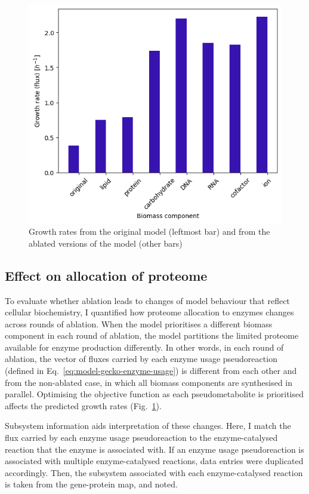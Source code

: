 \begin{figure}
  \centering
  \includegraphics[width=.6\linewidth]{ablation_example_fluxes.png}
  \caption{
    Growth rates from the original model (leftmost bar) and from the ablated versions of the model (other bars)
  }
  \label{fig:model-ablate-fluxes}
\end{figure}


\subsection{Effect on allocation of proteome}
\label{sec:model-yeast8-pseudometabolites-allocation}

To evaluate whether ablation leads to changes of model behaviour that reflect cellular biochemistry, I quantified how proteome allocation to enzymes changes across rounds of ablation.
When the model prioritises a different biomass component in each round of ablation, the model partitions the limited proteome available for enzyme production differently.
In other words, in each round of ablation, the vector of fluxes carried by each enzyme usage pseudoreaction (defined in Eq.\ \ref{eq:model-gecko-enzyme-usage}) is different from each other and from the non-ablated case, in which all biomass components are synthesised in parallel.
Optimising the objective function as each pseudometabolite is prioritised affects the predicted growth rates (Fig.\ \ref{fig:model-ablate-fluxes}).

Subsystem information aids interpretation of these changes.
Here, I match the flux carried by each enzyme usage pseudoreaction to the enzyme-catalysed reaction that the enzyme is associated with.
If an enzyme usage pseudoreaction is associated with multiple enzyme-catalysed reactions, data entries were duplicated accordingly.
Then, the subsystem associated with each enzyme-catalysed reaction is taken from the gene-protein map, and noted.


